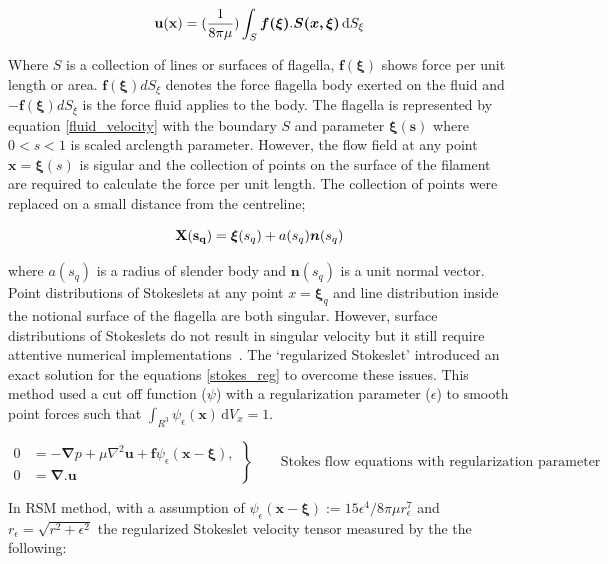 \documentclass[12pt,a4paper,titlepage]{report}
\begin{document}
\begin{equation}
\bold {u(x)} =(\frac{1}{8 \pi \mu}) \int_S \mathrm \bm{f(\xi)} . \bm{S( x, \xi)}\, \mathrm{d}S_{\xi}
\label{fluid_velocity}
\end{equation}

Where $S$ is a collection of lines or surfaces of flagella, $\bm{f(\xi)}$ shows force per unit length or area.
$\bm{f(\xi)} dS_{\xi}$ denotes the force flagella body exerted on the fluid and $-\bm{f(\xi)} dS_{\xi}$ is the 
force fluid applies to the body. The flagella is represented by equation \ref{fluid_velocity} with the boundary
$S$ and parameter $\bm{\xi (s)}$ where $0 < s <1$ is scaled arclength parameter. However, the flow field
at any point $\bm{x} = \bm{\xi} (s)$ is sigular and the collection of points on the surface of the filament 
are required to calculate the force per unit length. The collection of points were replaced on a small distance 
from the centreline;

\begin{equation}
\bold {X(s_q)} = \bm{\xi}(s_q) + a(s_q) \bm{n}(s_q)
\label{centreline}
\end{equation}

where $a(s_q)$ is a radius of slender body and $\bm{n}(s_q)$ is a unit normal vector. Point distributions of 
Stokeslets at any point $x = \bm{\xi}_q$ and line distribution inside the notional surface
of the flagella are both singular. However, surface distributions of Stokeslets do not result in singular  velocity
 but it still require attentive numerical implementations~\citep{smith2009boundary}. The \lq{regularized Stokeslet}\rq{}
 introduced an exact solution for the equations \ref{stokes_reg} to overcome these issues. 
This method used a cut off function ($\psi$) with a regularization parameter ($\epsilon$) to smooth point forces 
such that $\int_{R^3} \psi_{\epsilon} (\bm{x})\, \mathrm{d}V_x = 1$.



\begin{equation}
 \left.\begin{aligned}
        0 &= - \bm{\nabla} p + \mu \nabla ^ 2 \bm{u} + \bm{f} \psi_\epsilon (\bm{x} - \bm{\xi}), \\
        0 &=\bm{\nabla . u}
       \end{aligned}
 \right\}
 \qquad \text{Stokes flow equations with regularization parameter}
\label{stokes_reg}
\end{equation}

In RSM method, with a assumption of $\psi_{\epsilon}(\bm{x} - \bm{\xi}) := 15\epsilon^4 /8\pi \mu r_{\epsilon}^7$ 
and $r_{\epsilon} = \sqrt{r^2 + \epsilon ^2}$ the regularized Stokeslet velocity tensor measured by the the following:
\end{document}
